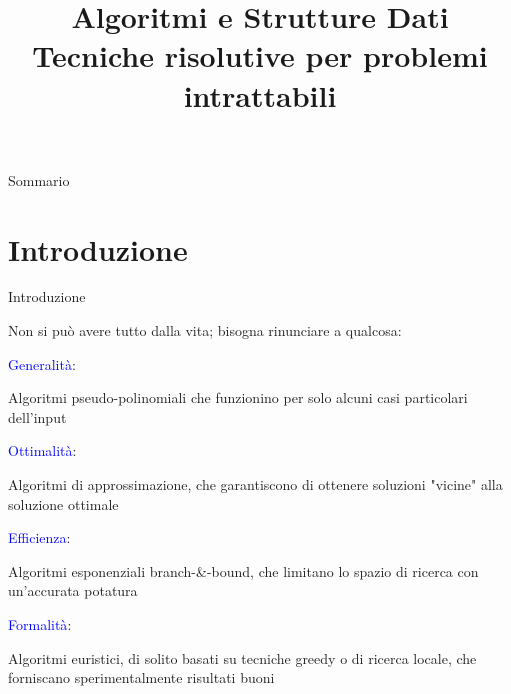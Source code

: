 
\title[ASD - Approssimazione]{\textbf{Algoritmi e Strutture Dati}\\[24pt]Tecniche risolutive per problemi intrattabili}

\usepackage{epigraph}
\usepackage{xcolor}
\usepackage{colortbl}

\newcommand{\PTIME}{\mbox{\sc $\mathbb{P}$}}
\renewcommand{\NP}{\mbox{$\mathbb{NP}$}}
\newcommand{\TIME}{\mbox{$\mathbb{TIME}$}}
\newcommand{\EXPTIME}{\mbox{$\mathbb{EXPTIME}$}}
\newcommand{\SPACE}{\mbox{$\mathbb{SPACE}$}}
\newcommand{\PSPACE}{\mbox{$\mathbb{PSPACE}$}}

\newcommand{\R}[1]{\textcolor{red}{#1}}
\newcommand{\B}[1]{\textcolor{blue}{#1}}

\renewcommand{\arraystretch}{1.4}
\graphicspath{{figs/19/}}
\renewcommand{\enumerazione}{\fontproc{enumeration}}
\newcommand{\isAdmissible}{\fontproc{isAdmissible}}



\FrameTitle{}

\begin{PlainFrame}{Sommario}
\end{PlainFrame}



\section{Introduzione}


\begin{frame}{Introduzione}


Non si può avere tutto dalla vita; bisogna rinunciare a qualcosa:
\BIL
\item \B{Generalità}: 
  \BI
  \item Algoritmi \alert{pseudo-polinomiali} che funzionino per
    solo alcuni casi particolari dell'input
  \EI
\item \B{Ottimalità}: 
  \BI
  \item Algoritmi di \alert{approssimazione}, che garantiscono di ottenere soluzioni "vicine" alla soluzione ottimale
  \EI
\item \B{Efficienza}:
  \BI
  \item Algoritmi esponenziali \alert{branch-\&-bound}, che limitano lo spazio di ricerca con un'accurata potatura
  \EI
\item \B{Formalità}: 
  \BI
  \item Algoritmi \alert{euristici}, di solito basati su tecniche greedy o di ricerca locale, che forniscano sperimentalmente risultati buoni
  \EI
\EIL

\end{frame}

